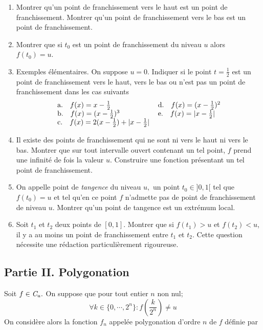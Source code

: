 \begin{enumerate}
\item  Montrer qu'un point de franchissement vers le haut est un point de franchissement. Montrer qu'un point de franchissement vers le bas est un
point de franchissement.

\item  Montrer que si $t_{0}$ est un point de franchissement du niveau $u$ alors $f(t_{0})=u$.

\item  Exemples {\'e}l{\'e}mentaires. On suppose $u=0$. Indiquer si le point $t=\frac{1}{2}$ est un point de franchissement vers le haut, vers le bas ou
n'est pas un point de franchissement dans les cas suivants
\[
\begin{tabular}{ll}
a.\quad $f(x)=x-\frac{1}{2}$ & d.\quad $f(x)=(x-\frac{1}{2})^{2}$ \\
b.\quad $f(x)=(x-\frac{1}{2})^{3}$ & e.\quad $f(x)=| x-\frac{1}{2}| $ \\
c.\quad $f(x)=2(x-\frac{1}{2})+| x-\frac{1}{2}| $ &
\end{tabular}
\]

\item  Il existe des points de franchissement qui ne sont ni vers le haut ni vers le bas. Montrer que sur tout intervalle ouvert contenant un tel point, $f$ prend une infinit{\'e} de fois la valeur $u$. Construire une fonction pr{\'e}sentant un tel point de franchissement.

\item  On appelle point de \emph{tangence} du niveau $u,$ un point $t_{0}\in ] 0,1[ $ tel que $f(t_{0})=u$ et tel qu'en ce point $f$ n'admette
pas de point de franchissement de niveau $u$. Montrer qu'un point de tangence est un extr{\'e}mum local.

\item  Soit $t_{1}$ et $t_{2}$ deux points de $[ 0,1] $. Montrer que si $f(t_{1})>u$ et $f(t_{2})<u$, il y a au moins un point de
franchissement entre $t_{1}$ et $t_{2}$. Cette question n{\'e}cessite une r{\'e}daction particuli{\`e}rement rigoureuse.
\end{enumerate}

\subsection*{Partie II. Polygonation}

Soit $f\in \emph{C}_{u}.$ On suppose que pour tout entier $n$ non nul;
\[
\forall k\in \{ 0,\cdots ,2^{n}\} :f(\frac{k}{2^{n}})\neq u
\]
On consid{\`e}re alors la fonction $f_{n}$ appel{\'e}e polygonation d'ordre $n$ de $f$ d{\'e}finie par

